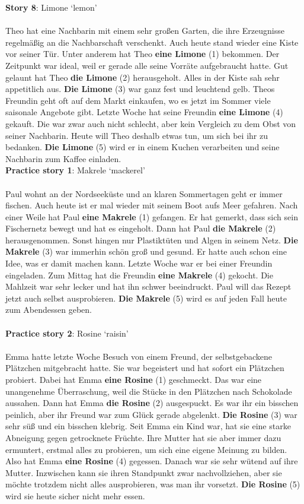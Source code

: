 \newpage
\textbf{Story 8}: Limone `lemon'\\
\\
Theo hat eine Nachbarin mit einem sehr großen Garten, die ihre Erzeugnisse regelmäßig an die Nachbarschaft verschenkt. Auch heute stand wieder eine Kiste vor seiner Tür. Unter anderem hat Theo \textbf{eine Limone} (1) bekommen. Der Zeitpunkt war ideal, weil er gerade alle seine Vorräte aufgebraucht hatte. Gut gelaunt hat Theo \textbf{die Limone} (2) herausgeholt. Alles in der Kiste sah sehr appetitlich aus. \textbf{Die Limone} (3) war ganz fest und leuchtend gelb. Theos Freundin geht oft auf dem Markt einkaufen, wo es jetzt im Sommer viele saisonale Angebote gibt. Letzte Woche hat seine Freundin \textbf{eine Limone} (4) gekauft. Die war zwar auch nicht schlecht, aber kein Vergleich zu dem Obst von seiner Nachbarin. Heute will Theo deshalb etwas tun, um sich bei ihr zu bedanken. \textbf{Die Limone} (5) wird er in einem Kuchen verarbeiten und seine Nachbarin zum Kaffee einladen.\\

\largerpage
\textbf{Practice story 1}: Makrele `mackerel'\\
\\
Paul wohnt an der Nordseeküste und an klaren Sommertagen geht er immer fischen. Auch heute ist er mal wieder mit seinem Boot aufs Meer gefahren. Nach einer Weile hat Paul \textbf{eine Makrele} (1) gefangen. Er hat gemerkt, dass sich sein Fischernetz bewegt und hat es eingeholt. Dann hat Paul \textbf{die Makrele} (2) herausgenommen. Sonst hingen nur Plastiktüten und Algen in seinem Netz. \textbf{Die Makrele} (3) war immerhin schön groß und gesund. Er hatte auch schon eine Idee, was er damit machen kann. Letzte Woche war er bei einer Freundin eingeladen. Zum Mittag hat die Freundin \textbf{eine Makrele} (4) gekocht. Die Mahlzeit war sehr lecker und hat ihn schwer beeindruckt. Paul will das Rezept jetzt auch selbst ausprobieren. \textbf{Die Makrele} (5) wird es auf jeden Fall heute zum Abendessen geben.\\
\\
\textbf{Practice story 2}: Rosine `raisin'\\
\\
Emma hatte letzte Woche Besuch von einem Freund, der selbstgebackene Plätzchen mitgebracht hatte. Sie war begeistert und hat sofort ein Plätzchen probiert. Dabei hat Emma \textbf{eine Rosine} (1) geschmeckt. Das war eine unangenehme Überraschung, weil die Stücke in den Plätzchen nach Schokolade aussahen. Dann hat Emma \textbf{die Rosine} (2) ausgespuckt. Es war ihr ein bisschen peinlich, aber ihr Freund war zum Glück gerade abgelenkt. \textbf{Die Rosine} (3) war sehr süß und ein bisschen klebrig. Seit Emma ein Kind war, hat sie eine starke Abneigung gegen getrocknete Früchte. Ihre Mutter hat sie aber immer dazu ermuntert, erstmal alles zu probieren, um sich eine eigene Meinung zu bilden. Also hat Emma \textbf{eine Rosine} (4) gegessen. Danach war sie sehr wütend auf ihre Mutter. Inzwischen kann sie ihren Standpunkt zwar nachvollziehen, aber sie möchte trotzdem nicht alles ausprobieren, was man ihr vorsetzt. \textbf{Die Rosine} (5) wird sie heute sicher nicht mehr essen.

